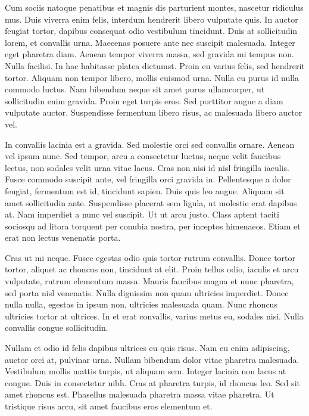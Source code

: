 Cum sociis natoque penatibus et magnis dis parturient montes, nascetur ridiculus mus. Duis viverra enim felis, interdum hendrerit libero vulputate quis. In auctor feugiat tortor, dapibus consequat odio vestibulum tincidunt. Duis at sollicitudin lorem, et convallis urna. Maecenas posuere ante nec suscipit malesuada. Integer eget pharetra diam. Aenean tempor viverra massa, sed gravida mi tempus non. Nulla facilisi. In hac habitasse platea dictumst. Proin eu varius felis, sed hendrerit tortor. Aliquam non tempor libero, mollis euismod urna. Nulla eu purus id nulla commodo luctus. Nam bibendum neque sit amet purus ullamcorper, ut sollicitudin enim gravida. Proin eget turpis eros. Sed porttitor augue a diam vulputate auctor. Suspendisse fermentum libero risus, ac malesuada libero auctor vel.

In convallis lacinia est a gravida. Sed molestie orci sed convallis ornare. Aenean vel ipsum nunc. Sed tempor, arcu a consectetur luctus, neque velit faucibus lectus, non sodales velit urna vitae lacus. Cras non nisi id nisl fringilla iaculis. Fusce commodo suscipit ante, vel fringilla orci gravida in. Pellentesque a dolor feugiat, fermentum est id, tincidunt sapien. Duis quis leo augue. Aliquam sit amet sollicitudin ante. Suspendisse placerat sem ligula, ut molestie erat dapibus at. Nam imperdiet a nunc vel suscipit. Ut ut arcu justo. Class aptent taciti sociosqu ad litora torquent per conubia nostra, per inceptos himenaeos. Etiam et erat non lectus venenatis porta.

Cras ut mi neque. Fusce egestas odio quis tortor rutrum convallis. Donec tortor tortor, aliquet ac rhoncus non, tincidunt at elit. Proin tellus odio, iaculis et arcu vulputate, rutrum elementum massa. Mauris faucibus magna et nunc pharetra, sed porta nisl venenatis. Nulla dignissim non quam ultricies imperdiet. Donec nulla nulla, egestas in ipsum non, ultricies malesuada quam. Nunc rhoncus ultricies tortor at ultrices. In et erat convallis, varius metus eu, sodales nisi. Nulla convallis congue sollicitudin.

Nullam et odio id felis dapibus ultrices eu quis risus. Nam eu enim adipiscing, auctor orci at, pulvinar urna. Nullam bibendum dolor vitae pharetra malesuada. Vestibulum mollis mattis turpis, ut aliquam sem. Integer lacinia non lacus at congue. Duis in consectetur nibh. Cras at pharetra turpis, id rhoncus leo. Sed sit amet rhoncus est. Phasellus malesuada pharetra massa vitae pharetra. Ut tristique risus arcu, sit amet faucibus eros elementum et.


